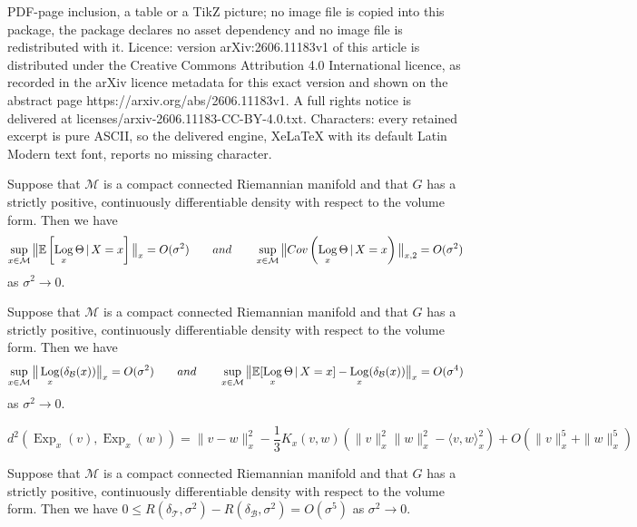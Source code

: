 \documentclass[10pt,a4paper]{amsart}
\DeclareMathOperator{\Exp}{Exp}
\DeclareMathOperator{\Log}{Log}
\newcommand{\B}{\mathcal{B}}
\newcommand{\Cov}{\textnormal{Cov}}
\newcommand{\Ebb}{\mathbb{E}}
\newcommand{\Mcal}{\mathcal{M}}
\newcommand{\T}{\mathcal{T}}
\begin{document}
PDF-page inclusion, a table or a TikZ picture; no image file is copied into this package, the package declares no asset dependency and no image file is redistributed with it. Licence: version arXiv:2606.11183v1 of this article is distributed under the Creative Commons Attribution 4.0 International licence, as recorded in the arXiv licence metadata for this exact version and shown on the abstract page https://arxiv.org/abs/2606.11183v1. A full rights notice is delivered at licenses/arxiv-2606.11183-CC-BY-4.0.txt. Characters: every retained excerpt is pure ASCII, so the delivered engine, XeLaTeX with its default Latin Modern text font, reports no missing character.
\begin{proposition}\label{prop:mux-sigmax-estimates}
Suppose that $\Mcal$ is a compact connected Riemannian manifold and that $G$ has a strictly positive, continuously differentiable density with respect to the volume form. Then we have
\begin{equation*}
\sup_{x\in\Mcal} \big\|\Ebb\left[\Log_x\Theta\,|\,X=x\right]\big\|_x = O(\sigma^2)\qquad \textnormal{ and }\qquad \sup_{x\in\Mcal}\big\|\Cov\left(\Log_x\Theta\,|\,X=x\right)\big\|_{x,2} = O(\sigma^2)
\end{equation*}
as $\sigma^2\to 0$.
\end{proposition}

\begin{proposition}\label{prop:wB-estimates}
Suppose that $\Mcal$ is a compact connected Riemannian manifold and that $G$ has a strictly positive, continuously differentiable density with respect to the volume form. Then we have
\begin{equation*}
    \sup_{x\in\Mcal} \big\|\Log_x(\delta_{\B}(x)) \big\|_x = O(\sigma^2) \qquad \textnormal{ and }\qquad \sup_{x\in\Mcal}\big\|\Ebb[\Log_x\Theta\,|\,X=x]-\Log_x(\delta_{\B}(x)) \big\|_x = O(\sigma^4)
\end{equation*}
as $\sigma^2\to 0$.
\end{proposition}

\begin{equation}\label{eqn:sq-dist-Taylor}
    d^2(\Exp_x(v),\Exp_x(w)) = \|v-w\|_x^2 - \frac{1}{3} K_x(v,w)(\|v\|^2_x\|w\|_x^2-\langle v,w\rangle_x^2) + O(\|v\|_x^5 + \|w\|_x^5)
\end{equation}

\begin{theorem}
\label{thm:uncond-main}
Suppose that $\Mcal$ is a compact connected Riemannian manifold and that $G$ has a strictly positive, continuously differentiable density with respect to the volume form. Then we have $0 \le R(\delta_{\T},\sigma^2) - R(\delta_{\B},\sigma^2) = O(\sigma^5)$ as $\sigma^2\to 0$.
\end{theorem}
\end{document}
